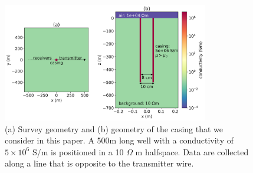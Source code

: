 \begin{figure}
    \begin{center}
    \includegraphics[width=0.8\textwidth]{figures/setup.png}
    \end{center}
\caption{(a) Survey geometry and (b) geometry of the casing that we consider in this paper. A 500m long well with a conductivity of $5\times10^6$ S/m is positioned in a 10 $\Omega$ m halfspace. Data are collected along a line that is opposite to the transmitter wire.
}
\label{fig:setup}
\end{figure}



